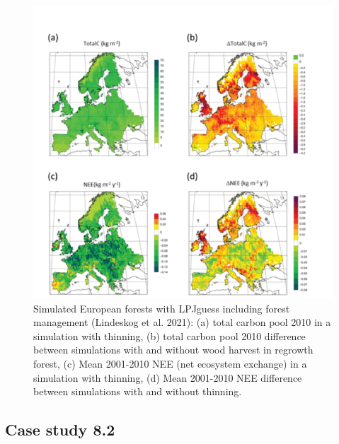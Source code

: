 \documentclass[
  12pt,
  oneside]{book}
\begin{document}
\begin{figure}

{\centering \includegraphics[width=0.8\linewidth]{figures/chap8/f815_LPJ_manag_result} 

}

\caption{Simulated European forests with LPJguess including forest management (Lindeskog et al. 2021): (a) total carbon pool 2010 in a simulation with thinning, (b) total carbon pool 2010 difference between simulations with and without wood harvest in regrowth forest, (c) Mean 2001-2010 NEE (net ecosystem exchange) in a simulation with thinning, (d) Mean 2001-2010 NEE difference between simulations with and without thinning.}\label{fig:f815}
\end{figure}

\hypertarget{case-study-8.2}{%
\subsection{Case study 8.2}\label{case-study-8.2}}
\end{document}
